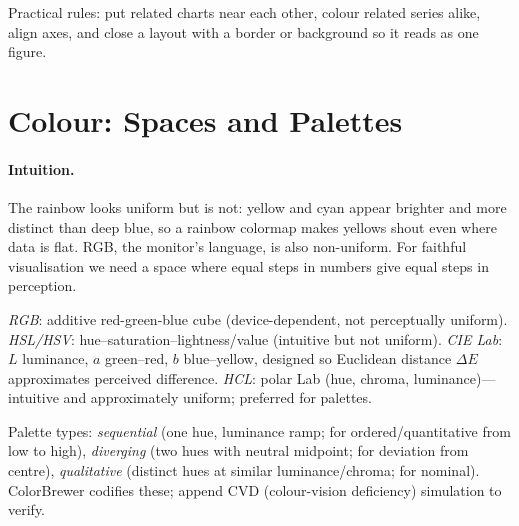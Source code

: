 Practical rules: put related charts near each other, colour related series alike, align axes, and close a layout with a border or background so it reads as one figure.

\section{Colour: Spaces and Palettes}
\label{sec:colour}
\paragraph{Intuition.} The rainbow looks uniform but is not: yellow and cyan appear brighter and more distinct than deep blue, so a rainbow colormap makes yellows shout even where data is flat. RGB, the monitor's language, is also non-uniform. For faithful visualisation we need a space where equal steps in numbers give equal steps in perception.

\begin{definition}\label{def:colour-spaces}
\emph{RGB}: additive red-green-blue cube (device-dependent, not perceptually uniform). \emph{HSL/HSV}: hue--saturation--lightness/value (intuitive but not uniform). \emph{CIE Lab}: $L$ luminance, $a$ green--red, $b$ blue--yellow, designed so Euclidean distance $\Delta E$ approximates perceived difference. \emph{HCL}: polar Lab (hue, chroma, luminance)---intuitive and approximately uniform; preferred for palettes.
\end{definition}

Palette types: \emph{sequential} (one hue, luminance ramp; for ordered/quantitative from low to high), \emph{diverging} (two hues with neutral midpoint; for deviation from centre), \emph{qualitative} (distinct hues at similar luminance/chroma; for nominal). ColorBrewer codifies these; append CVD (colour-vision deficiency) simulation to verify.

